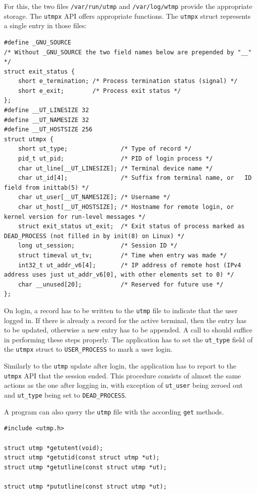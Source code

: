 \documentclass[10pt,a4paper,titlepage,twoside,english,final]{zhawreprt}
\begin{document}
For this, the two files \texttt{/var/run/utmp} and \texttt{/var/log/wtmp} provide the appropriate storage.
The \texttt{utmpx} \gls{API} offers appropriate functions.
The \texttt{utmpx} struct represents a single entry in those files:
\setlistingC
\begin{lstlisting}[caption={Definition of the utmpx structure {\citep[p.819]{KerriskTLPI}}},label=lst:UtmpxDefinition]
#define _GNU_SOURCE
/* Without _GNU_SOURCE the two field names below are prepended by "__" */
struct exit_status {
	short e_termination; /* Process termination status (signal) */
	short e_exit; 		 /* Process exit status */
};
#define __UT_LINESIZE 32
#define __UT_NAMESIZE 32
#define __UT_HOSTSIZE 256
struct utmpx {
	short ut_type; 				 /* Type of record */
	pid_t ut_pid; 				 /* PID of login process */
	char ut_line[__UT_LINESIZE]; /* Terminal device name */
	char ut_id[4]; 				 /* Suffix from terminal name, or	ID field from inittab(5) */
	char ut_user[__UT_NAMESIZE]; /* Username */
	char ut_host[__UT_HOSTSIZE]; /* Hostname for remote login, or kernel version for run-level messages */
	struct exit_status ut_exit;  /* Exit status of process marked as DEAD_PROCESS (not filled in by init(8) on Linux) */
	long ut_session; 			 /* Session ID */
	struct timeval ut_tv; 		 /* Time when entry was made */
	int32_t ut_addr_v6[4]; 		 /* IP address of remote host (IPv4 address uses just ut_addr_v6[0], with other elements set to 0) */
	char __unused[20]; 			 /* Reserved for future use */
};
\end{lstlisting}

On \gls{login}, a record has to be written to the \texttt{utmp} file to indicate that the user logged in.
If there is already a record for the active \gls{terminal}, then the entry has to be updated, otherwise a new entry has to be appended.
A call to \cite{pututxline} should suffice in performing these steps properly.
The application has to set the \texttt{ut\_type} field of the \texttt{utmpx} struct to \texttt{USER\_PROCESS} to mark a user \gls{login}.

Similarly to the \texttt{utmp} update after \gls{login}, the application has to report to the \texttt{utmpx} \gls{API} that the session ended.
This procedure consists of almost the same actions as the one after logging in, with exception of \texttt{ut\_user} being zeroed out and \texttt{ut\_type} being set to \texttt{DEAD\_PROCESS}\citep[p.828]{KerriskTLPI}.

A program can also query the \texttt{utmp} file with the according \texttt{get} methods.
\setlistingC
\begin{lstlisting}[caption={\texttt{utmpx} \gls{API} functions},label=lst:UtmpxApiFunctions]
#include <utmp.h>

struct utmp *getutent(void);
struct utmp *getutid(const struct utmp *ut);
struct utmp *getutline(const struct utmp *ut);

struct utmp *pututline(const struct utmp *ut);
\end{lstlisting}
\end{document}
